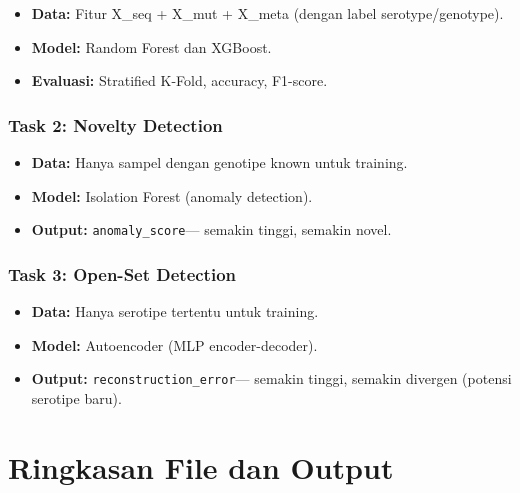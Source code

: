 \documentclass[12pt,a4paper]{article}
\begin{document}
\begin{itemize}
    \item \textbf{Data:} Fitur X\_seq + X\_mut + X\_meta (dengan label serotype/genotype).
    \item \textbf{Model:} Random Forest dan XGBoost.
    \item \textbf{Evaluasi:} Stratified K-Fold, accuracy, F1-score.
\end{itemize}

\subsubsection{Task 2: Novelty Detection}

\begin{itemize}
    \item \textbf{Data:} Hanya sampel dengan genotipe known untuk training.
    \item \textbf{Model:} Isolation Forest (anomaly detection).
    \item \textbf{Output:} \texttt{anomaly\_score}--- semakin tinggi, semakin novel.
\end{itemize}

\subsubsection{Task 3: Open-Set Detection}

\begin{itemize}
    \item \textbf{Data:} Hanya serotipe tertentu untuk training.
    \item \textbf{Model:} Autoencoder (MLP encoder-decoder).
    \item \textbf{Output:} \texttt{reconstruction\_error}--- semakin tinggi, semakin divergen (potensi serotipe baru).
\end{itemize}

\section{Ringkasan File dan Output}
\end{document}

